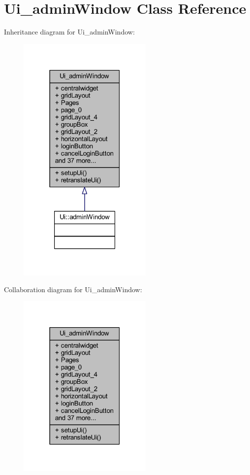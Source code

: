 \hypertarget{class_ui__admin_window}{}\section{Ui\+\_\+admin\+Window Class Reference}
\label{class_ui__admin_window}


Inheritance diagram for Ui\+\_\+admin\+Window\+:\nopagebreak
\begin{figure}[H]
\begin{center}
\leavevmode
\includegraphics[width=186pt]{class_ui__admin_window__inherit__graph}
\end{center}
\end{figure}


Collaboration diagram for Ui\+\_\+admin\+Window\+:\nopagebreak
\begin{figure}[H]
\begin{center}
\leavevmode
\includegraphics[width=186pt]{class_ui__admin_window__coll__graph}
\end{center}
\end{figure}
